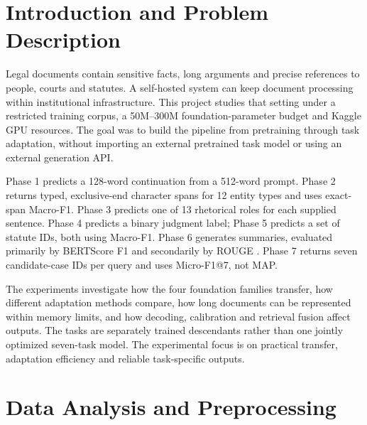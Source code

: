 \documentclass[11pt, oneside]{article}
\begin{document}
\section{Introduction and Problem Description}
Legal documents contain sensitive facts, long arguments and precise references to
people, courts and statutes. A self-hosted system can keep document processing within
institutional infrastructure. This project studies that setting under a restricted
training corpus, a 50M--300M foundation-parameter budget and Kaggle GPU resources.
The goal was to build the pipeline from pretraining through task adaptation, without
importing an external pretrained task model or using an external generation API.

Phase 1 predicts a 128-word continuation from a 512-word prompt. Phase 2 returns
typed, exclusive-end character spans for 12 entity types and uses exact-span Macro-F1.
Phase 3 predicts one of 13 rhetorical roles for each supplied sentence. Phase 4
predicts a binary judgment label; Phase 5 predicts a set of statute IDs, both using
Macro-F1. Phase 6 generates summaries, evaluated primarily by BERTScore F1
\cite{zhang2020bertscore} and secondarily by ROUGE . Phase 7
returns seven candidate-case IDs per query and uses Micro-F1@7, not MAP.

The experiments investigate how the four foundation families transfer, how different
adaptation methods compare, how long documents can be represented within memory
limits, and how decoding, calibration and retrieval fusion affect outputs. The tasks
are separately trained descendants rather than one jointly optimized seven-task model.
The experimental focus is on practical transfer, adaptation efficiency and reliable task-specific outputs.

\section{Data Analysis and Preprocessing}
\end{document}
